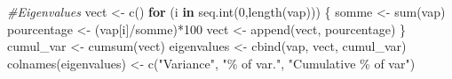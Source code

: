 \documentclass[
]{article}
\newenvironment{Shaded}{\begin{snugshade}}{\end{snugshade}}
\newcommand{\CommentTok}[1]{\textcolor[rgb]{0.56,0.35,0.01}{\textit{#1}}}
\newcommand{\ControlFlowTok}[1]{\textcolor[rgb]{0.13,0.29,0.53}{\textbf{#1}}}
\newcommand{\DecValTok}[1]{\textcolor[rgb]{0.00,0.00,0.81}{#1}}
\newcommand{\FunctionTok}[1]{\textcolor[rgb]{0.00,0.00,0.00}{#1}}
\newcommand{\NormalTok}[1]{#1}
\newcommand{\OtherTok}[1]{\textcolor[rgb]{0.56,0.35,0.01}{#1}}
\newcommand{\SpecialCharTok}[1]{\textcolor[rgb]{0.00,0.00,0.00}{#1}}
\newcommand{\StringTok}[1]{\textcolor[rgb]{0.31,0.60,0.02}{#1}}
\begin{document}
\begin{Shaded}
\begin{Highlighting}[]
    \CommentTok{\#Eigenvalues}
\NormalTok{  vect }\OtherTok{\textless{}{-}} \FunctionTok{c}\NormalTok{()}
  \ControlFlowTok{for}\NormalTok{ (i }\ControlFlowTok{in} \FunctionTok{seq.int}\NormalTok{(}\DecValTok{0}\NormalTok{,}\FunctionTok{length}\NormalTok{(vap))) \{}
\NormalTok{    somme }\OtherTok{\textless{}{-}} \FunctionTok{sum}\NormalTok{(vap)}
\NormalTok{    pourcentage }\OtherTok{\textless{}{-}}\NormalTok{ (vap[i]}\SpecialCharTok{/}\NormalTok{somme)}\SpecialCharTok{*}\DecValTok{100}
\NormalTok{    vect }\OtherTok{\textless{}{-}} \FunctionTok{append}\NormalTok{(vect, pourcentage)}
\NormalTok{  \}}
\NormalTok{  cumul\_var }\OtherTok{\textless{}{-}} \FunctionTok{cumsum}\NormalTok{(vect)}
\NormalTok{  eigenvalues }\OtherTok{\textless{}{-}} \FunctionTok{cbind}\NormalTok{(vap, vect, cumul\_var)}
  \FunctionTok{colnames}\NormalTok{(eigenvalues) }\OtherTok{\textless{}{-}} \FunctionTok{c}\NormalTok{(}\StringTok{"Variance"}\NormalTok{, }\StringTok{"\% of var."}\NormalTok{, }\StringTok{"Cumulative \% of var"}\NormalTok{)}
  

\end{Highlighting}
\end{Shaded}
\end{document}
